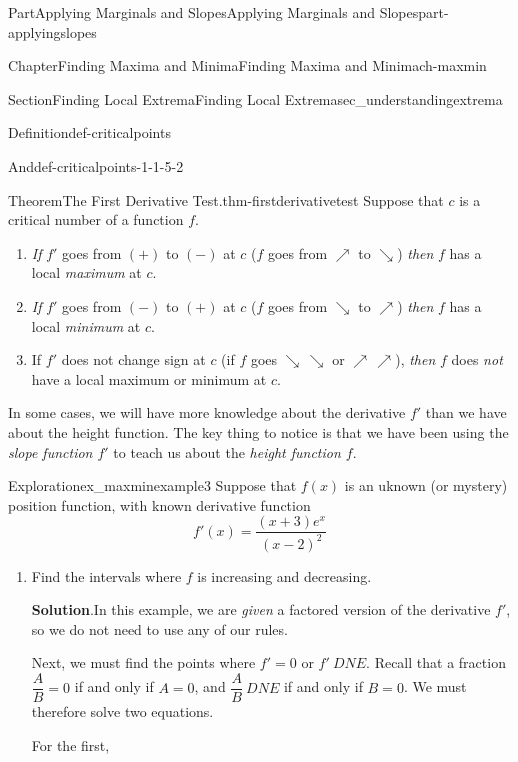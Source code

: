 \documentclass[oneside,10pt,]{tufte-book}
\newcommand{\blocktitlefont}{\relax}
\numberwithin{equation}{chapter}
\begin{document}
\begin{partptx}{Part}{Applying Marginals and Slopes}{}{Applying Marginals and Slopes}{}{}{part-applyingslopes}
\begin{chapterptx}{Chapter}{Finding Maxima and Minima}{}{Finding Maxima and Minima}{}{}{ch-maxmin}
\begin{sectionptx}{Section}{Finding Local Extrema}{}{Finding Local Extrema}{}{}{sec_understandingextrema}
\begin{definition}{Definition}{}{def-criticalpoints}
\begin{descriptionlist}
\begin{dlimedium}{And}{def-criticalpoints-1-1-5-2}
%
\end{dlimedium}%
\end{descriptionlist}
%
\end{definition}
\begin{theorem}{Theorem}{The First Derivative Test.}{}{thm-firstderivativetest}%
Suppose that \(c\) is a critical number of a function \(f\).%
%
\begin{enumerate}
\item{}\emph{If} \(f'\) goes from \((+)\) to \((-)\) at \(c\) (\(f\) goes from \(\nearrow\) to \(\searrow\)) \emph{then} \(f\) has a local \emph{maximum} at \(c\).%
\item{}\emph{If} \(f'\) goes from \((-)\) to \((+)\) at \(c\) (\(f\) goes from \(\searrow\) to \(\nearrow\)) \emph{then} \(f\) has a local \emph{minimum} at \(c\).%
\item{}If \(f'\) does not change sign at \(c\) (if \(f\) goes \(\searrow\,\searrow\) or \(\nearrow\,\nearrow\)), \emph{then} \(f\) does \emph{not} have a local maximum or minimum at \(c\).%
\end{enumerate}
\end{theorem}
In some cases, we will have more knowledge about the derivative \(f'\) than we have about the height function. The key thing to notice is that we have been using the \emph{slope function \(f'\)} to teach us about the \emph{height function \(f\)}.%
\begin{exploration}{Exploration}{}{ex_maxminexample3}%
Suppose that \(f(x)\) is an uknown (or mystery) position function, with known derivative function%
\begin{equation*}
f'(x) = \dfrac{(x+3)e^x}{(x-2)^2}
\end{equation*}
%
\begin{enumerate}[font=\bfseries,label=(\alph*),ref=\alph*]%
\item{}Find the intervals where \(f\) is increasing and decreasing.%
\par\smallskip%
\noindent\textbf{\blocktitlefont Solution}.\hypertarget{ex_maxminexample3-2-2}{}\quad{}In this example, we are \emph{given} a factored version of the derivative \(f'\), so we do not need to use any of our rules.%
\par
Next, we must find the points where \(f'=0\) or \(f'\ DNE\).  Recall that a fraction \(\dfrac{A}{B}=0\) if and only if \(A=0\), and \(\dfrac{A}{B}\ DNE\) if and only if \(B=0\).  We must therefore solve two equations.%
\par
For the first,%
\begin{align*}

\end{align*}
\end{enumerate}
\end{exploration}
\end{sectionptx}
\end{chapterptx}
\end{partptx}
\end{document}
